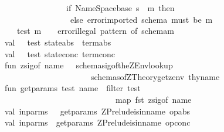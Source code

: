 \begin{isabellebody}
\ \ \ \ \ \ \ \ \ \ \ \ \ \ \ \ \ \ \ \ \ \ \ \ \ \ \ \ \ \ \ \ {\isachardollar}\ {\isacharunderscore}{\isacharparenright}\isanewline
\ \ \ \ \ \ \ \ \ \ \ \ \ \ \ \ \ \ \ \ \ \ \ \ \ \ \ \ \ {\isachardollar}\ {\isacharunderscore}\ {\isachardollar}\ {\isacharunderscore}{\isacharparenright}\isanewline
\ \ \ \ \ \ \ \ \ \ \ \ \ \ \ \ \ \ \ \ \ \ \ \ \ \ {\isachardollar}\ {\isacharunderscore}{\isacharparenright}\ {\isachardollar}\ {\isacharunderscore}{\isacharparenright}\ {\isacharequal}\ \isanewline
\ \ \ \ \ \ \ \ \ \ \ \ \ \ \ \ \ \ \ \ \ \ \ \ \ \ {\isacharparenleft}if\ {\isacharparenleft}NameSpace{\isachardot}base\ s{\isacharparenright}\ {\isacharequal}\ m\ then\ {\isacharparenleft}{\isacharparenright}\isanewline
\ \ \ \ \ \ \ \ \ \ \ \ \ \ \ \ \ \ \ \ \ \ \ \ \ \ \ else\ error{\isacharparenleft}{\isachardoublequote}imported\ schema\ must\ be\ {\isacharcolon}{\isachardoublequote}{\isacharcircum}m{\isacharparenright}{\isacharparenright}\isanewline
\ \ \ \ \ \ \ \ \ \ \ \ \ \ {\isacharbar}test\ m\ {\isacharunderscore}\ \ {\isacharequal}\ error{\isacharparenleft}{\isachardoublequote}illegal\ pattern\ of\ schema{\isacharcolon}{\isachardoublequote}{\isacharcircum}m{\isacharparenright}\ \isanewline
\ \ \ \ \ \ \ \ \ \ \ val\ {\isacharunderscore}\ {\isacharequal}\ test\ state{\isacharunderscore}abs\ \ term{\isacharunderscore}abs\isanewline
\ \ \ \ \ \ \ \ \ \ \ val\ {\isacharunderscore}\ {\isacharequal}\ test\ state{\isacharunderscore}conc\ term{\isacharunderscore}conc\isanewline
\isanewline
\ \ \ \ \ \ \ \ \ \ \ fun\ zsig{\isacharunderscore}of\ name\ {\isacharequal}\ \ schemasig{\isacharunderscore}of{\isacharparenleft}the{\isacharparenleft}ZEnv{\isachardot}lookup\ \isanewline
\ \ \ \ \ \ \ \ \ \ \ \ \ \ \ \ \ \ \ \ \ \ \ \ \ \ \ \ \ \ \ \ {\isacharparenleft}schemas{\isacharunderscore}of{\isacharparenleft}ZTheory{\isachardot}get{\isacharunderscore}zenv\ thy{\isacharparenright}{\isacharcomma}name{\isacharparenright}{\isacharparenright}{\isacharparenright}\isanewline
\ \ \ \ \ \ \ \ \ \ \ fun\ get{\isacharunderscore}params\ test\ name\ {\isacharequal}\ filter\ test\isanewline
\ \ \ \ \ \ \ \ \ \ \ \ \ \ \ \ \ \ \ \ \ \ \ \ \ \ \ \ \ \ \ \ \ \ \ \ \ \ {\isacharparenleft}map\ fst\ {\isacharparenleft}zsig{\isacharunderscore}of\ name{\isacharparenright}{\isacharparenright}\isanewline
\ \ \ \ \ \ \ \ \ \ \ val\ in{\isacharunderscore}parms\ \ {\isacharequal}\ get{\isacharunderscore}params\ ZPrelude{\isachardot}is{\isacharunderscore}in{\isacharunderscore}name\ op{\isacharunderscore}abs\isanewline
\ \ \ \ \ \ \ \ \ \ \ val\ in{\isacharunderscore}parms{\isacharprime}\ {\isacharequal}\ get{\isacharunderscore}params\ ZPrelude{\isachardot}is{\isacharunderscore}in{\isacharunderscore}name\ op{\isacharunderscore}conc\isanewline

\end{isabellebody}
